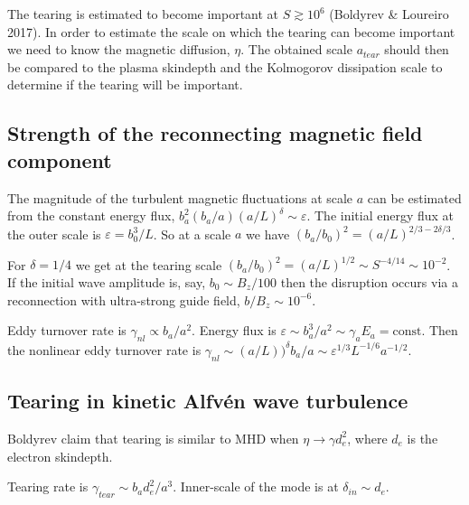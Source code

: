 \documentclass[usenatbib,twocolumn]{aastex63}
\begin{document}
\begin{appendix}
The tearing is estimated to become important at $S \gtrsim 10^6$ (Boldyrev \& Loureiro 2017).
In order to estimate the scale on which the tearing can become important we need to know the magnetic diffusion, $\eta$.
The obtained scale $a_{tear}$ should then be compared to the plasma skindepth and the Kolmogorov dissipation scale to determine if the tearing will be important.

\subsection{Strength of the reconnecting magnetic field component}

The magnitude of the turbulent magnetic fluctuations at scale $a$ can be estimated from the constant energy flux, $b_a^2 (b_a/a)(a/L)^{\delta} \sim \varepsilon$.
The initial energy flux at the outer scale is $\varepsilon = b_0^3 /L$.
So at a scale $a$ we have 
$(b_a/b_0)^2 = (a/L)^{2/3 -2\delta/3}$.

For $\delta = 1/4$ we get at the tearing scale $(b_a/b_0)^2 = (a/L)^{1/2} \sim S^{-4/14} \sim 10^{-2}$.
If the initial wave amplitude is, say, $b_0 \sim B_z/100$ then the disruption occurs via a reconnection with ultra-strong guide field, $b/B_z \sim 10^{-6}$.



Eddy turnover rate is $\gamma_{nl} \propto b_a/a^2$.
Energy flux is $\varepsilon \sim b_a^3/a^2 \sim \gamma_a E_a = \mathrm{const}$.
Then the nonlinear eddy turnover rate is $\gamma_{nl} \sim (a/L))^\delta b_a/a \sim \varepsilon^{1/3} L^{-1/6} a^{-1/2}$.




\subsection{Tearing in kinetic Alfv\'en wave turbulence}

Boldyrev claim that tearing is similar to MHD when $\eta \rightarrow \gamma d_e^2$, where $d_e$ is the electron skindepth.

Tearing rate is $\gamma_{tear} \sim b_a d_e^2/a^3$.
Inner-scale of the mode is at $\delta_{in} \sim d_e$.



\end{appendix}
\end{document}
